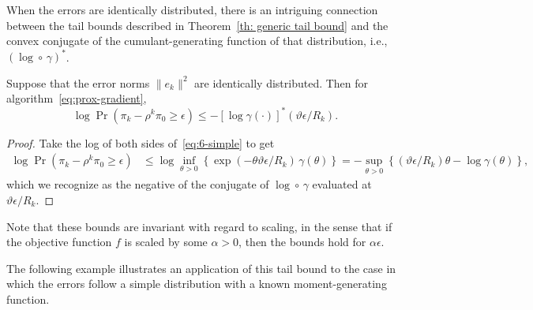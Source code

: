 When the errors are identically distributed, there is an intriguing
connection between the tail bounds described in Theorem~\ref{th:
  generic tail bound} and the convex conjugate of the
cumulant-generating function of that distribution, i.e., $(\log\circ
\,\gamma)^{*}$.

\begin{thm}
  \label{co:simple-log}
  Suppose that the error norms $\|e_k\|^2$ are identically
  distributed. Then for algorithm~\eqref{eq:prox-gradient},
  \begin{equation*}
    \log\Pr(\pi_k - \rho^k\pi_0 \ge \epsilon)
    \le
    -\left[\log\gamma(\cdot)\right]^*(\vartheta\epsilon/R_k).
  \end{equation*}
\end{thm}
\begin{proof}
  Take the log of both sides of~\eqref{eq:6-simple} to get
  \begin{align*}
    \log\Pr(\pi_k - \rho^k\pi_0 \ge \epsilon)
     &\le
     \log\inf_{\theta>0}
     \left\{
       \exp(-\theta \vartheta\epsilon/R_k)\, \gamma(\theta)
     \right\}
   =-\sup_{\theta>0}
   \left\{
     (\vartheta\epsilon/R_k)\theta - \log\gamma(\theta)
   \right\},
  \end{align*}
  which we recognize as the negative of the conjugate of
  $\log\circ\,\gamma$ evaluated at $\vartheta\epsilon/R_k$.
\end{proof}


Note that these bounds are invariant with regard to scaling, in
the sense that if the objective function $f$ is scaled by some
$\alpha>0$, then the bounds hold for $\alpha\epsilon$.

The following example illustrates an application of this tail bound to
the case in which the errors follow a simple distribution with a known
moment-generating function.

